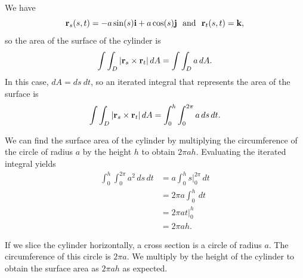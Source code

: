 \begin{bighint}

\end{bighint}
\begin{activitySolution}
\ba
\item We have 
\[\mathbf{r}_s(s,t) = -a\sin(s) \mathbf{i} + a\cos(s) \mathbf{j}  \ \text{ and } \ \mathbf{r}_t(s,t) = \mathbf{k},\]
so the area of the surface of the cylinder is 
\[\int \int_D |\mathbf{r}_s \times \mathbf{r}_t| \, dA = \int \int_D a \, dA.\]
In this case, $dA = ds \ dt$, so an iterated integral that represents the area of the surface is 
\[\int \int_D |\mathbf{r}_s \times \mathbf{r}_t| \, dA = \int_{0}^{h} \int_{0}^{2 \pi} a \, ds \, dt.\]

\item We can find the surface area of the cylinder by multiplying the circumference of the circle of radius $a$ by the height $h$ to obtain $2 \pi a h$. Evaluating the iterated integral yields
\begin{align*}
\int_{0}^{h} \int_{0}^{2 \pi} a^2 \, ds \, dt &= a \int_{0}^{h} \left. s \right|_{0}^{2 \pi}  \, dt \\
	&= 2 \pi a \int_{0}^{h}  \, dt \\
	&= 2 \pi a \left. t \right|_{0}^{h}  \\
	&= 2 \pi a h.
\end{align*}

\item If we slice the cylinder horizontally, a cross section is a circle of radius $a$. The circumference of this circle is $2 \pi a$. We multiply by the height of the cylinder to obtain the surface area as $2 \pi a h$ as expected. 
\ea
\end{activitySolution}
\aftera

